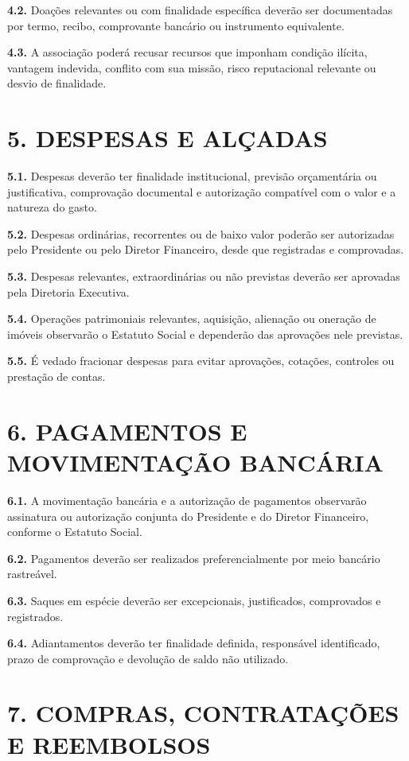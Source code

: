 \documentclass[11pt,a4paper]{article}
\begin{document}
\textbf{4.2.} Doações relevantes ou com finalidade específica deverão ser documentadas por termo, recibo, comprovante bancário ou instrumento equivalente.

\textbf{4.3.} A associação poderá recusar recursos que imponham condição ilícita, vantagem indevida, conflito com sua missão, risco reputacional relevante ou desvio de finalidade.

\section*{5. DESPESAS E ALÇADAS}

\textbf{5.1.} Despesas deverão ter finalidade institucional, previsão orçamentária ou justificativa, comprovação documental e autorização compatível com o valor e a natureza do gasto.

\textbf{5.2.} Despesas ordinárias, recorrentes ou de baixo valor poderão ser autorizadas pelo Presidente ou pelo Diretor Financeiro, desde que registradas e comprovadas.

\textbf{5.3.} Despesas relevantes, extraordinárias ou não previstas deverão ser aprovadas pela Diretoria Executiva.

\textbf{5.4.} Operações patrimoniais relevantes, aquisição, alienação ou oneração de imóveis observarão o Estatuto Social e dependerão das aprovações nele previstas.

\textbf{5.5.} É vedado fracionar despesas para evitar aprovações, cotações, controles ou prestação de contas.

\section*{6. PAGAMENTOS E MOVIMENTAÇÃO BANCÁRIA}

\textbf{6.1.} A movimentação bancária e a autorização de pagamentos observarão assinatura ou autorização conjunta do Presidente e do Diretor Financeiro, conforme o Estatuto Social.

\textbf{6.2.} Pagamentos deverão ser realizados preferencialmente por meio bancário rastreável.

\textbf{6.3.} Saques em espécie deverão ser excepcionais, justificados, comprovados e registrados.

\textbf{6.4.} Adiantamentos deverão ter finalidade definida, responsável identificado, prazo de comprovação e devolução de saldo não utilizado.

\section*{7. COMPRAS, CONTRATAÇÕES E REEMBOLSOS}
\end{document}
